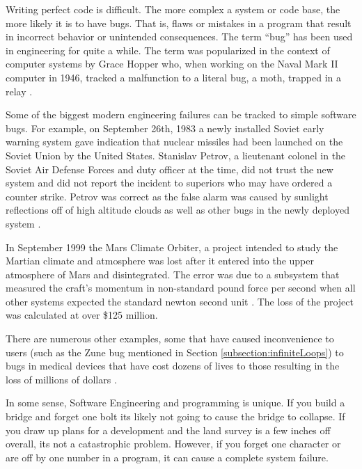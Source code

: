 

Writing perfect code is difficult.  The more complex a system or
code base, the more likely it is to have \glspl{bug}.  That is, flaws
or mistakes in a program that result in incorrect behavior or 
unintended consequences.  The term ``bug'' has been used in
engineering for quite a while.  The term was popularized in the
context of computer systems by Grace Hopper who, when working
on the Naval Mark II computer in 1946, tracked a malfunction to
a literal bug, a moth, trapped in a relay \cite{hopperBug11}.

Some of the biggest modern engineering failures can be
tracked to simple software bugs.  For example, on September 
26th, 1983 a newly installed Soviet early warning 
system gave indication that nuclear missiles had been launched 
on the Soviet Union by the United States.  Stanislav Petrov, a 
lieutenant colonel in the Soviet Air Defense Forces and duty officer 
at the time, did not trust the new system and did not report the
incident to superiors who may have ordered a counter strike.  
Petrov was correct as the false alarm was caused by sunlight
reflections off of high altitude clouds as well as other bugs in 
the newly deployed system \cite{stanislav83}.  

In September 1999 the Mars Climate Orbiter, a project intended to
study the Martian climate and atmosphere was lost after it entered
into the upper atmosphere of Mars and disintegrated.
The error was due to a subsystem that 
measured the craft's momentum in non-standard pound force per 
second when all other systems expected the standard newton
second unit \cite{mars1999}.  The loss of the project was
calculated at over \$125 million.

There are numerous other examples, some that have caused
inconvenience to users (such as the Zune bug mentioned in 
Section \ref{subsection:infiniteLoops}) to bugs in medical devices
that have cost dozens of lives to those resulting in the loss of
millions of dollars \cite{wikipediaListofBugs}.

In some sense, Software Engineering and programming 
is unique.  If you build a bridge and forget one bolt its likely 
not going to cause the bridge to collapse.  If you draw up 
plans for a development and the land survey is a few inches 
off overall, its not a catastrophic problem.  However, if you 
forget one character or are off by one number in a program, 
it can cause a complete system failure.

